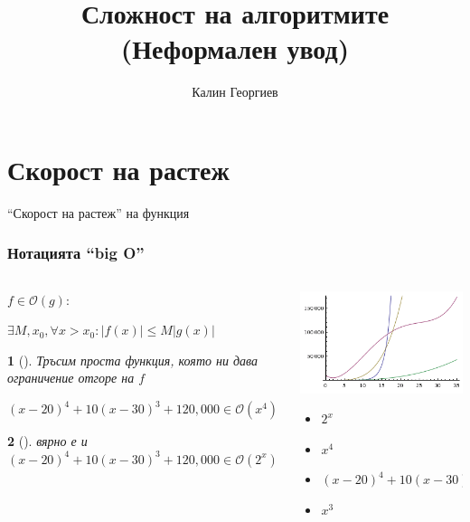 \documentclass{beamer}
\newtheorem*{remark}{}
\begin{document}
\title[Увод в програмирането]{Сложност на алгоритмите (Неформален увод)} 
\author{Калин Георгиев}

\frame{\titlepage} 


\section{Скорост на растеж}


\begin{frame}
\centerline{``Скорост на растеж'' на функция}
\end{frame}



\begin{frame}[fragile]
\frametitle{Нотацията ``big O''}


\begin{columns}[t]
  \begin{column}{0.6\textwidth}


$f \in \mathcal{O}(g):$

\begin{adjustwidth}{0.5cm}{}
$\exists M,x_0,\forall x > x_0:|f(x)| \le M|g(x)| $
\end{adjustwidth}

\vspace{15px}

\begin{remark}[]
    Тръсим проста функция, която ни дава ограничение отгоре на $f$
\end{remark}

\vspace{15px}

$(x-20)^4+10(x-30)^3+120,000 \in \mathcal{O}(x^4)$


\pause
\begin{remark}[]
    вярно е и $(x-20)^4+10(x-30)^3+120,000 \in \mathcal{O}(2^x)$
\end{remark}


  \end{column}
  \begin{column}{0.4\textwidth}
   \vspace*{-65pt}
    \includegraphics[width=5cm]{images/fourgraphs}
    \begin{flushleft}
    \begin{itemize}
      \item $2^x$
      \item $x^4$
      \item $(x-20)^4+10(x-30)^3+120,000$
      \item $x^3$
    \end{itemize}
      

\end{flushleft}
\end{column}
\end{columns}
\end{frame}
\end{document}
